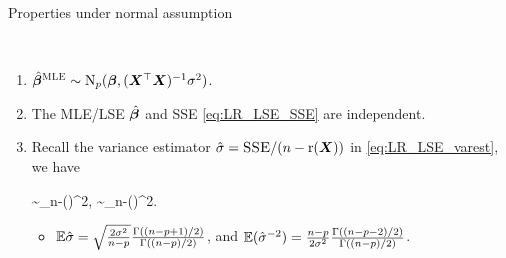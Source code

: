 \documentclass[10pt,a4paper]{book}
\begin{document}
\begin{thmbox}{Properties under normal assumption}
	\begin{proposition}\label{prop:LR_full_rank_normal_prop} \
		\begin{enumerate}
			\item $\hat{{\boldsymbol\beta}}^{\textsc{MLE}}\sim\mathrm{N}_p({\boldsymbol\beta},({\boldsymbol X}^\top{\boldsymbol X})^{-1}\sigma^2)$. 
			\item The MLE/LSE $\hat{{\boldsymbol\beta}}$ and SSE \eqref{eq:LR_LSE_SSE} are independent.
			\item Recall the variance estimator $\hat{\sigma}=\textsc{SSE}/(n-\mathrm{r}({\boldsymbol X}))$ in \eqref{eq:LR_LSE_varest}, we have \begin{salign*}
				\frac{\SSE}{\sigma^2}\sim\chi_{n-\rmr(\X)}^2, \quad \text{ or } \quad {}\sim\chi_{n-\rmr(\X)}^2.
			\end{salign*}
			\begin{itemize}
				\item $\mathbb E\hat{\sigma}=\sqrt{\frac{2\sigma^2}{n-p}}\frac{\Gamma((n-p+1)/2)}{\Gamma((n-p)/2)}$, and $\mathbb E(\hat{\sigma}^{-2})=\frac{n-p}{2\sigma^2}\frac{\Gamma((n-p-2)/2)}{\Gamma((n-p)/2)}$.
			\end{itemize}
		\end{enumerate}
	\end{proposition}
\end{thmbox}
\end{document}
